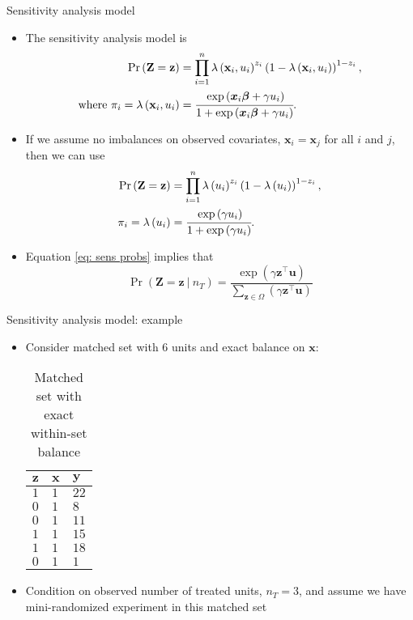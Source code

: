 \documentclass[table, xcolor={dvipsnames}, 9pt]{beamer}
\newcommand\given[1][]{\:#1\vert\:}
\theoremstyle{newstyle}
\begin{document}
\begin{frame}{Sensitivity analysis model}
\vfill
\begin{itemize} \vfill
\item The sensitivity analysis model is \vfill
\begin{align*} 
\Pr\left(\mathbf{Z} = \mathbf{z}\right) & = \prod \limits_{i = 1}^n \lambda\left(\mathbf{x}_i, u_i\right)^{z_i} \left(1 - \lambda\left(\mathbf{x}_i, u_i\right)\right)^{1 - z_i}, \\
\text{where } \pi_i = \lambda\left(\mathbf{x}_i, u_i\right) & = \cfrac{\exp\left(\bm{x}_i\bm{\beta} + \gamma u_i\right)}{1 + \exp\left(\bm{x}_i\bm{\beta} + \gamma u_i\right)}.
\end{align*} \vfill
\item \pause If we assume no imbalances on observed covariates, $\bm{x}_i = \bm{x}_j$ for all $i$ and $j$, then we can use \pause \vfill
\begin{align} 
\Pr\left(\mathbf{Z} = \mathbf{z}\right) & = \prod \limits_{i = 1}^n \lambda\left(u_i\right)^{z_i} \left(1 - \lambda\left(u_i\right)\right)^{1 - z_i}, \\
\pi_i = \lambda\left(u_i\right) & = \cfrac{\exp\left(\gamma u_i\right)}{1 + \exp\left(\gamma u_i\right)}. \label{eq: sens probs}
\end{align} \vfill
\item \pause Equation \eqref{eq: sens probs} implies that \vfill
\begin{equation}
\Pr\left(\bm{Z} = \bm{z} \given n_T\right) = \dfrac{\exp\left(\gamma \bm{z}^{\top} \bm{u}\right)}{\sum \limits_{\bm{z} \in \Omega} (\gamma \bm{z}^{\top} \bm{u})}
\end{equation} \vfill
\end{itemize}
\end{frame}
\begin{frame}{Sensitivity analysis model: example}
\vfill
\begin{itemize} \vfill
\item Consider matched set with $6$ units and exact balance on $\bm{x}$: \vfill
\begin{table}[H]
\centering{}
    \begin{tabular}{l|l|l}
   $\bm{z}$ & $\bm{x}$ & $\bm{y}$ \\ \hline
   $1$ & $1$ & $22$ \\
  $0$ & $1$ & $8$ \\
  $0$ & $1$ & $11$ \\
  $1$ & $1$ & $15$ \\
  $1$ & $1$ & $18$ \\
  $0$ & $1$ & $1$ \\
    \end{tabular}
\caption{Matched set with exact within-set balance}
\end{table} \vfill
\item Condition on observed number of treated units, $n_T = 3$, and assume we have mini-randomized experiment in this matched set \vfill
\end{itemize} \vfill
\end{frame}
\end{document}
